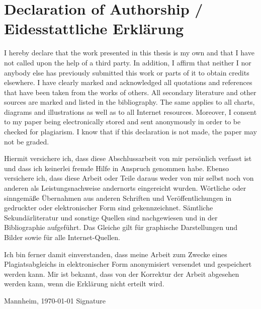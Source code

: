 \chapter*{\large Declaration of Authorship / Eidesstattliche Erkl\"{a}rung}
\pagestyle{empty}
I hereby declare that the work presented in this thesis is my own and that I have not called upon the help of a third party. In addition, I affirm that neither I nor anybody else has previously submitted this work or parts of it to obtain credits elsewhere. I have clearly marked and acknowledged all quotations and references that have been taken from the works of others. All secondary literature and other sources are marked and listed in the bibliography. The same applies to all charts, diagrams and illustrations as well as to all Internet resources. Moreover, I consent to my paper being electronically stored and sent anonymously in order to be checked for plagiarism. I know that if this declaration is not made, the paper may not be graded.

\vspace{-0.3cm}

\hrulefill

\vspace{-0.2cm}
Hiermit versichere ich, dass diese Abschlussarbeit von mir persönlich verfasst
ist und dass ich keinerlei fremde Hilfe in Anspruch genommen habe. Ebenso
versichere ich, dass diese Arbeit oder Teile daraus weder von mir selbst noch
von anderen als Leistungsnachweise andernorts eingereicht wurden. Wörtliche oder
sinn\-gemäße Übernahmen aus anderen Schriften und Veröffentlichungen in gedruckter
oder elektronischer Form sind gekennzeichnet. Sämtliche Sekundärliteratur und
sonstige Quellen sind nachgewiesen und in der Bibliographie aufgeführt. Das
Glei\-che gilt für graphische Darstellungen und Bilder sowie für alle
Internet-Quellen.

Ich bin ferner damit einverstanden, dass meine Arbeit zum Zwecke eines
Plagiatsabgleichs in elektronischer Form anonymisiert versendet und gespeichert
werden kann. Mir ist bekannt, dass von der Korrektur der Arbeit abgesehen werden
kann, wenn die Erklärung nicht erteilt wird.

\vspace{2.0cm}

Mannheim, \today \hspace{7cm} Signature\\